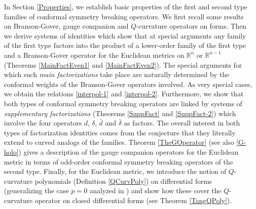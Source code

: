 \documentclass[a4paper,12pt,reqno]{amsart}
\numberwithin{theorem}{subsection}
\numberwithin{equation}{section}
\begin{document}
In Section \ref{Properties}, we establish basic properties of the first and
second type families of conformal symmetry breaking operators. We first recall
some results on Branson-Gover, gauge companion and $Q$-curvature operators
\cite{BransonGover} on forms. Then we derive systems of identities which show
that at special arguments any family of the first type factors into the product
of a lower-order family of the first type and a Branson-Gover operator for the
Euclidean metrics on ${\mathbb{R}}^n$ or ${\mathbb{R}}^{n-1}$ (Theorems \ref{MainFactEven1} and
\ref{MainFactEven2}). The special arguments for which such {\em main
factorizations} take place are naturally determined by the conformal weights of
the Branson-Gover operators involved. As very special cases, we obtain the
relations \eqref{interpol-1} and \eqref{interpol-2}. Furthermore, we show that
both types of conformal symmetry breaking operators are linked by systems of
{\em supplementary factorizations} (Theorems \ref{SuppFact} and
\ref{SuppFact-2}) which involve the four operators $d$, $\delta$, $\bar{d}$
and $\bar{\delta}$ as factors. The overall interest in both types of
factorization identities comes from the conjecture that they literally extend
to curved analogs of the families. Theorem \ref{TheGOperator} (see also
\eqref{G-holo}) gives a description of the gauge companion operators for the
Euclidean metric in terms of odd-order conformal symmetry breaking operators of
the second type. Finally, for the Euclidean metric, we introduce the notion of
$Q$-curvature polynomials (Definition \ref{QCurvPoly}) on differential forms
(generalizing the case $p=0$ analyzed in \cite{Juhl1}) and show how these cover
the $Q$-curvature operator on closed differential forms (see Theorem
\ref{TangQPoly}). \vspace{3pt}
\end{document}
